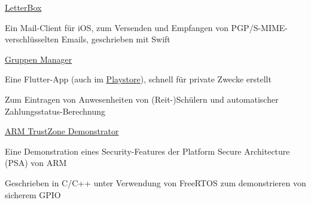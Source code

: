 
\begin{cventries}
  \cventry
    {} %
    {\href{https://git.imp.fu-berlin.de/enzevalos/enzevalos_iphone}{LetterBox}} %
    {} %
    {} %
    {
      \begin{cvitems} %
        \item {Ein Mail-Client für iOS, zum Versenden und Empfangen von PGP/S-MIME-verschlüsselten Emails, geschrieben mit Swift}
      \end{cvitems}
    }

  \cventry
    {} %
    {\href{https://github.com/HannesGitH/kruemel_reiten}{Gruppen Manager}} %
    {} %
    {} %
    {
      \begin{cvitems} %
      	\item {Eine Flutter-App (auch im \href{https://play.google.com/store/apps/details?id=tools.hannepps.kruemelreiten}{Playstore}), schnell für private Zwecke erstellt}
		\item {Zum Eintragen von Anwesenheiten von (Reit-)Schülern und automatischer Zahlungsstatus-Berechnung}
      \end{cvitems}
    }
    
  \cventry
    {} %
    {\href{https://github.com/larissazech/SWP_Telematik}{ARM TrustZone Demonstrator}} %
    {} %
    {} %
    {
      \begin{cvitems} %
      	\item {Eine Demonstration eines Security-Features der Platform Secure Architecture (PSA) von ARM}
		\item {Geschrieben in C/C++ unter Verwendung von FreeRTOS zum demonstrieren von sicherem GPIO}
      \end{cvitems}
    }
    
\end{cventries}